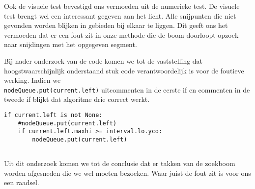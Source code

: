 \documentclass[11pt,a4paper]{article}
\begin{document}
Ook de visuele test bevestigd ons vermoeden uit de numerieke test. De visuele test brengt wel een interessant gegeven aan het licht. Alle snijpunten die niet gevonden worden blijken in gebieden bij elkaar te liggen. Dit geeft ons het vermoeden dat er een fout zit in onze methode die de boom doorloopt opzoek naar snijdingen met het opgegeven segment.

Bij nader onderzoek van de code komen we tot de vaststelling dat hoogstwaarschijnlijk onderstaand stuk code verantwoordelijk is voor de foutieve werking. Indien we \\ \verb|nodeQueue.put(current.left)| uitcommenten in de eerste if en commenten in de tweede if blijkt dat algoritme drie correct werkt.

\begin{verbatim}
if current.left is not None:
    #nodeQueue.put(current.left)
    if current.left.maxhi >= interval.lo.yco:
        nodeQueue.put(current.left)
                
\end{verbatim}

Uit dit onderzoek komen we tot de conclusie dat er takken van de zoekboom worden afgesneden die we wel moeten bezoeken. Waar juist de fout zit is voor ons een raadsel.
\end{document}

